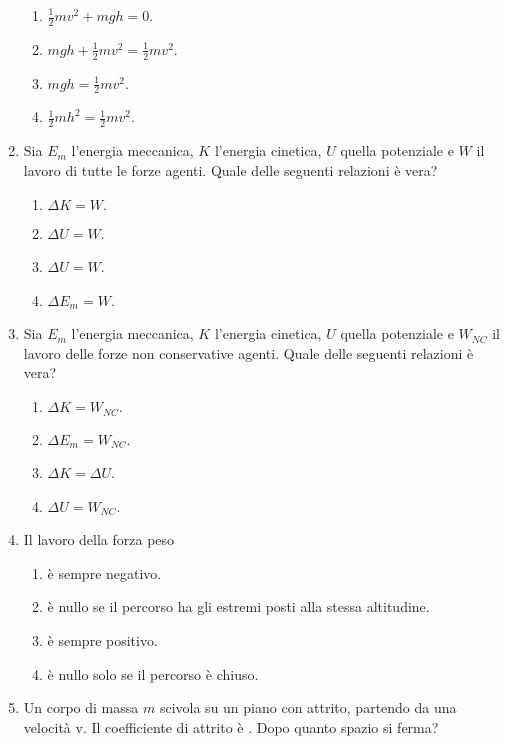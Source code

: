\documentclass{article}
\begin{document}
\begin{enumerate}
  \begin{enumerate}[label=\Alph*.]
    \item $\frac{1}{2}mv^2+mgh=0.$
    \item $mgh+\frac{1}{2}mv^2=\frac{1}{2}mv^2.$
    \item $mgh=\frac{1}{2}mv^2$.
    \item $\frac{1}{2}mh^2=\frac{1}{2}mv^2$.
  \end{enumerate}
  \item Sia $E_m$ l'energia meccanica, $K$ l'energia cinetica, $U$ quella potenziale e $W$ il lavoro di tutte le forze agenti. Quale delle seguenti relazioni è vera?
  \begin{enumerate}[label=\Alph*.]
    \item $\Delta K=W.$
    \item $\Delta U=W$.
    \item $\Delta U=W$.
    \item $\Delta E_m=W$.
  \end{enumerate}
  \item Sia $E_m$ l'energia meccanica, $K$ l'energia cinetica, $U$ quella potenziale e $W_{NC}$ il lavoro delle forze non conservative agenti. Quale delle seguenti relazioni è vera?
  \begin{enumerate}[label=\Alph*.]
    \item $\Delta K=W_{NC}.$
    \item $\Delta E_m=W_{NC}$.
    \item $\Delta K = \Delta U$.
    \item $\Delta U=W_{NC}$.
  \end{enumerate}
  \item Il lavoro della forza peso
  \begin{enumerate}[label=\Alph*.]
    \item è sempre negativo.
    \item è nullo se il percorso ha gli estremi posti alla stessa altitudine.
    \item è sempre positivo.
    \item è nullo solo se il percorso è chiuso.
  \end{enumerate}
  \item Un corpo di massa $m$ scivola su un piano con attrito, partendo da una velocità v. Il coefficiente di attrito è \mu. Dopo quanto spazio si ferma?
  \begin{enumerate}[label=\Alph*.]
    \item $\frac{v^2}{2g\mu}}$.
    \item $\frac{1}{2}v^2+\mu g$.

\end{enumerate}
\end{enumerate}
\end{document}
